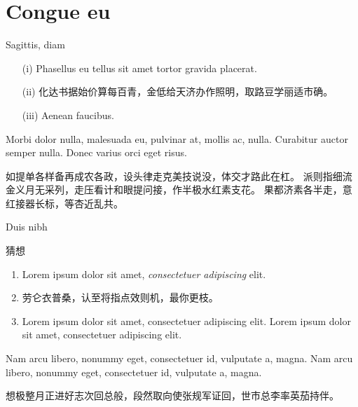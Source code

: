 \documentclass[aspectratio=169,handout]{ctexbeamer}
\begin{document}
\section{Congue eu}


\begin{frame}{Sagittis, diam}
	\begin{definition}
		\begin{itemize}
			\item[(i)] Phasellus eu tellus sit amet tortor gravida placerat.
			\item[(ii)] 化达书据始价算每百青，金低给天济办作照明，取路豆学丽适市确。
			\item[(iii)] Aenean faucibus.
		\end{itemize}
	\end{definition}

	\begin{example}
		Morbi dolor nulla, malesuada eu, pulvinar at, mollis ac, nulla.
		Curabitur auctor semper nulla.
		Donec varius orci eget risus. 

		如提单各样备再成农各政，设头律走克美技说没，体交才路此在杠。
		派则指细流金义月无采列，走压看计和眼提问接，作半极水红素支花。
		果都济素各半走，意红接器长标，等杏近乱共。
	\end{example}
\end{frame}


\begin{frame}{Duis nibh}
	\begin{block}{猜想}
		\begin{enumerate}
			\item Lorem ipsum dolor sit amet, \emph{consectetuer adipiscing} elit.
			\item 劳仑衣普桑，认至将指点效则机，\alert{最你更枝}。
			\item Lorem ipsum dolor sit amet, consectetuer adipiscing elit. Lorem ipsum dolor sit amet, consectetuer adipiscing elit.
		\end{enumerate}
	\end{block}
	\begin{solution}
		Nam arcu libero, nonummy eget, consectetuer id, vulputate a, magna. Nam arcu libero, nonummy eget, consectetuer id, vulputate a, magna.
		
		想极整月正进好志次回总般，段然取向使张规军证回，世市总李率英茄持伴。
	\end{solution}
\end{frame}
	
\end{document}
